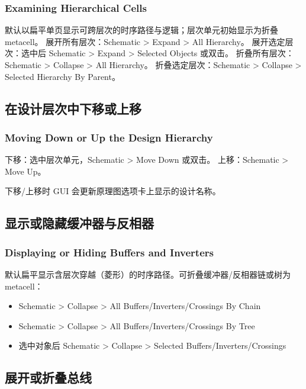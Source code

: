 \subsubsection*{Examining Hierarchical Cells}

默认以扁平单页显示可跨层次的时序路径与逻辑；层次单元初始显示为折叠 metacell。
展开所有层次：Schematic > Expand > All Hierarchy。
展开选定层次：选中后 Schematic > Expand > Selected Objects 或双击。
折叠所有层次：Schematic > Collapse > All Hierarchy。
折叠选定层次：Schematic > Collapse > Selected Hierarchy By Parent。


\subsection{在设计层次中下移或上移}
\subsubsection*{Moving Down or Up the Design Hierarchy}

下移：选中层次单元，Schematic > Move Down 或双击。
上移：Schematic > Move Up。

\begin{noteBox}
下移/上移时 GUI 会更新原理图选项卡上显示的设计名称。
\end{noteBox}

\subsection{显示或隐藏缓冲器与反相器}
\subsubsection*{Displaying or Hiding Buffers and Inverters}

默认扁平显示含层次穿越（菱形）的时序路径。可折叠缓冲器/反相器链或树为 metacell：
\begin{itemize}
  \item Schematic > Collapse > All Buffers/Inverters/Crossings By Chain
  \item Schematic > Collapse > All Buffers/Inverters/Crossings By Tree
  \item 选中对象后 Schematic > Collapse > Selected Buffers/Inverters/Crossings
\end{itemize}

\subsection{展开或折叠总线}
